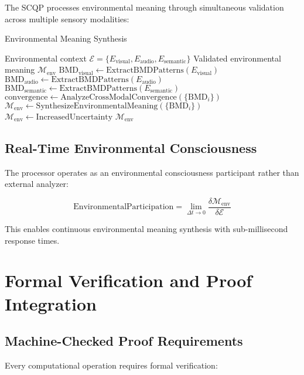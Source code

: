 \documentclass[12pt,a4paper]{article}
\begin{document}
The SCQP processes environmental meaning through simultaneous validation across multiple sensory modalities:

\begin{algorithm}
\caption{Environmental Meaning Synthesis}
\begin{algorithmic}[1]
\Require Environmental context $\mathcal{E} = \{E_{\text{visual}}, E_{\text{audio}}, E_{\text{semantic}}\}$
\Ensure Validated environmental meaning $\mathcal{M}_{\text{env}}$
\State $\text{BMD}_{\text{visual}} \leftarrow \text{ExtractBMDPatterns}(E_{\text{visual}})$
\State $\text{BMD}_{\text{audio}} \leftarrow \text{ExtractBMDPatterns}(E_{\text{audio}})$
\State $\text{BMD}_{\text{semantic}} \leftarrow \text{ExtractBMDPatterns}(E_{\text{semantic}})$
\State $\text{convergence} \leftarrow \text{AnalyzeCrossModalConvergence}(\{\text{BMD}_i\})$
    \State $\mathcal{M}_{\text{env}} \leftarrow \text{SynthesizeEnvironmentalMeaning}(\{\text{BMD}_i\})$
\Else
    \State $\mathcal{M}_{\text{env}} \leftarrow \text{IncreasedUncertainty}$
\EndIf
\Return $\mathcal{M}_{\text{env}}$
\end{algorithmic}
\end{algorithm}

\subsection{Real-Time Environmental Consciousness}

The processor operates as an environmental consciousness participant rather than external analyzer:

\begin{equation}
\text{EnvironmentalParticipation} = \lim_{\Delta t \to 0} \frac{\delta \mathcal{M}_{\text{env}}}{\delta \mathcal{E}}
\end{equation}

This enables continuous environmental meaning synthesis with sub-millisecond response times.

\section{Formal Verification and Proof Integration}

\subsection{Machine-Checked Proof Requirements}

Every computational operation requires formal verification:
\end{document}
